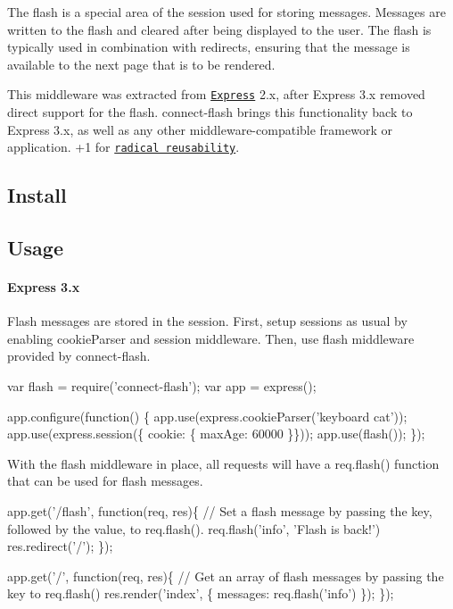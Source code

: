 The flash is a special area of the session used for storing messages. Messages are written to the flash and cleared after being displayed to the user. The flash is typically used in combination with redirects, ensuring that the message is available to the next page that is to be rendered.

This middleware was extracted from \href{http://expressjs.com/}{\tt Express} 2.\+x, after Express 3.\+x removed direct support for the flash. connect-\/flash brings this functionality back to Express 3.\+x, as well as any other middleware-\/compatible framework or application. +1 for \href{http://substack.net/posts/b96642/the-node-js-aesthetic}{\tt radical reusability}.

\subsection*{Install}



\subsection*{Usage}

\paragraph*{Express 3.\+x}

Flash messages are stored in the session. First, setup sessions as usual by enabling {\ttfamily cookie\+Parser} and {\ttfamily session} middleware. Then, use {\ttfamily flash} middleware provided by connect-\/flash.


\begin{DoxyCode}
var flash = require('connect-flash');
var app = express();

app.configure(function() \{
  app.use(express.cookieParser('keyboard cat'));
  app.use(express.session(\{ cookie: \{ maxAge: 60000 \}\}));
  app.use(flash());
\});
\end{DoxyCode}


With the {\ttfamily flash} middleware in place, all requests will have a {\ttfamily req.\+flash()} function that can be used for flash messages.


\begin{DoxyCode}
app.get('/flash', function(req, res)\{
  // Set a flash message by passing the key, followed by the value, to req.flash().
  req.flash('info', 'Flash is back!')
  res.redirect('/');
\});

app.get('/', function(req, res)\{
  // Get an array of flash messages by passing the key to req.flash()
  res.render('index', \{ messages: req.flash('info') \});
\});
\end{DoxyCode}


